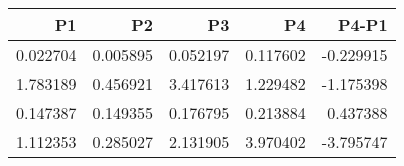 \begin{tabular}{rrrrr}
\toprule
P1 & P2 & P3 & P4 & P4-P1 \\
\midrule
0.022704 & 0.005895 & 0.052197 & 0.117602 & -0.229915 \\
1.783189 & 0.456921 & 3.417613 & 1.229482 & -1.175398 \\
0.147387 & 0.149355 & 0.176795 & 0.213884 & 0.437388 \\
1.112353 & 0.285027 & 2.131905 & 3.970402 & -3.795747 \\
\bottomrule
\end{tabular}
